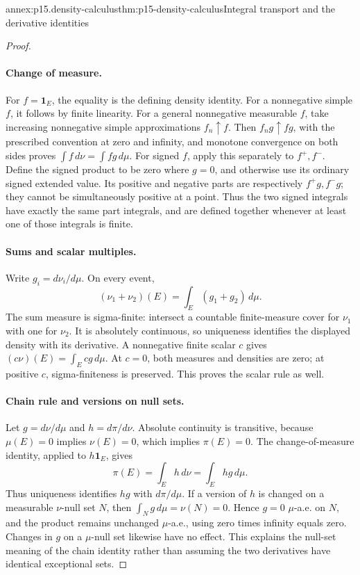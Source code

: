 \begin{annexitem}{annex:p15.density-calculus}{thm:p15-density-calculus}{Integral transport and the derivative identities}
\begin{proof}
\paragraph{Change of measure.}
For \(f=\mathbf1_E\), the equality is the defining density identity.
For a nonnegative simple \(f\), it follows by finite linearity.
For a general nonnegative measurable \(f\), take increasing nonnegative
simple approximations \(f_n\uparrow f\). Then \(f_ng\uparrow fg\),
with the prescribed convention at zero and infinity, and monotone
convergence on both sides proves
\(\int f\,d\nu=\int fg\,d\mu\).
For signed \(f\), apply this separately to \(f^+,f^-\).
Define the signed product to be zero where \(g=0\), and otherwise
use its ordinary signed extended value. Its positive and negative
parts are respectively \(f^+g,f^-g\); they cannot be simultaneously
positive at a point. Thus the two signed integrals have exactly the
same part integrals, and are defined together whenever at least one
of those integrals is finite.

\paragraph{Sums and scalar multiples.}
Write \(g_i=d\nu_i/d\mu\). On every event,
\[
                 (\nu_1+\nu_2)(E)=\int_E(g_1+g_2)\,d\mu.
\]
The sum measure is sigma-finite: intersect a countable finite-measure
cover for \(\nu_1\) with one for \(\nu_2\).
It is absolutely continuous, so uniqueness identifies the displayed
density with its derivative. A nonnegative finite scalar \(c\)
gives \((c\nu)(E)=\int_Ecg\,d\mu\). At \(c=0\), both measures and
densities are zero; at positive \(c\), sigma-finiteness is preserved.
This proves the scalar rule as well.

\paragraph{Chain rule and versions on null sets.}
Let \(g=d\nu/d\mu\) and \(h=d\pi/d\nu\).
Absolute continuity is transitive, because
\(\mu(E)=0\) implies \(\nu(E)=0\), which implies \(\pi(E)=0\).
The change-of-measure identity, applied to \(h\mathbf1_E\), gives
\[
                         \pi(E)=\int_Eh\,d\nu=\int_Ehg\,d\mu.
\]
Thus uniqueness identifies \(hg\) with \(d\pi/d\mu\).
If a version of \(h\) is changed on a measurable \(\nu\)-null set \(N\),
then \(\int_Ng\,d\mu=\nu(N)=0\).
Hence \(g=0\) \(\mu\)-a.e. on \(N\), and the product remains
unchanged \(\mu\)-a.e., using zero times infinity equals zero.
Changes in \(g\) on a \(\mu\)-null set likewise have no effect.
This explains the null-set meaning of the chain identity rather than
assuming the two derivatives have identical exceptional sets.


\end{proof}
\end{annexitem}
